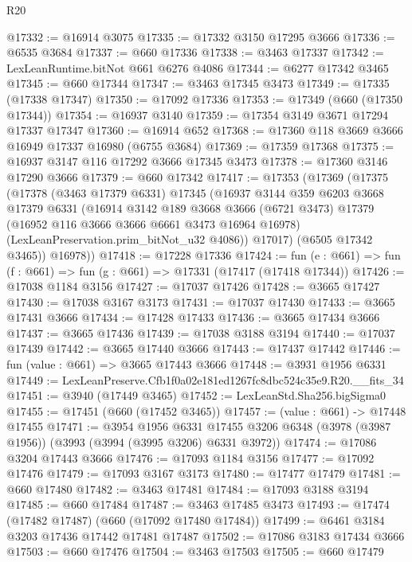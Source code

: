 \begin{lexlean}{R20}
\begin{coremodule}
@17332 := @16914 @3075
@17335 := @17332 @3150 @17295 @3666
@17336 := @6535 @3684
@17337 := @660 @17336
@17338 := @3463 @17337
@17342 := LexLeanRuntime.bitNot @661 @6276 @4086
@17344 := @6277 @17342 @3465
@17345 := @660 @17344
@17347 := @3463 @17345 @3473
@17349 := @17335 (@17338 @17347)
@17350 := @17092 @17336
@17353 := @17349 (@660 (@17350 @17344))
@17354 := @16937 @3140
@17359 := @17354 @3149 @3671 @17294 @17337 @17347
@17360 := @16914 @652
@17368 := @17360 @118 @3669 @3666 @16949 @17337 @16980 (@6755 @3684)
@17369 := @17359 @17368
@17375 := @16937 @3147 @116 @17292 @3666 @17345 @3473
@17378 := @17360 @3146 @17290 @3666
@17379 := @660 @17342
@17417 := @17353
    (@17369
      (@17375
        (@17378
          (@3463 @17379 @6331)
          @17345
          (@16937
            @3144
            @359
            @6203
            @3668
            @17379
            @6331
            (@16914
              @3142
              @189
              @3668
              @3666
              (@6721 @3473)
              @17379
              (@16952 @116 @3666 @3666 @6661 @3473 @16964 @16978)
              (LexLeanPreservation.prim_bitNot_u32 @4086))
            @17017)
          (@6505 @17342 @3465))
        @16978))
@17418 := @17228 @17336
@17424 := fun (e : @661) => fun (f : @661) => fun (g : @661) => @17331 (@17417 (@17418 @17344))
@17426 := @17038 @1184 @3156
@17427 := @17037 @17426
@17428 := @3665 @17427
@17430 := @17038 @3167 @3173
@17431 := @17037 @17430
@17433 := @3665 @17431 @3666
@17434 := @17428 @17433
@17436 := @3665 @17434 @3666
@17437 := @3665 @17436
@17439 := @17038 @3188 @3194
@17440 := @17037 @17439
@17442 := @3665 @17440 @3666
@17443 := @17437 @17442
@17446 := fun (value : @661) => @3665 @17443 @3666
@17448 := @3931 @1956 @6331
@17449 := LexLeanPreserve.Cfb1f0a02e181ed1267fc8dbc524c35e9.R20.__fits_34
@17451 := @3940 (@17449 @3465)
@17452 := LexLeanStd.Sha256.bigSigma0
@17455 := @17451 (@660 (@17452 @3465))
@17457 := (value : @661) -> @17448 @17455
@17471 := @3954
    @1956
    @6331
    @17455
    @3206
    @6348
    (@3978 (@3987 @1956))
    (@3993 (@3994 (@3995 @3206) @6331 @3972))
@17474 := @17086 @3204 @17443 @3666
@17476 := @17093 @1184 @3156
@17477 := @17092 @17476
@17479 := @17093 @3167 @3173
@17480 := @17477 @17479
@17481 := @660 @17480
@17482 := @3463 @17481
@17484 := @17093 @3188 @3194
@17485 := @660 @17484
@17487 := @3463 @17485 @3473
@17493 := @17474 (@17482 @17487) (@660 (@17092 @17480 @17484))
@17499 := @6461 @3184 @3203 @17436 @17442 @17481 @17487
@17502 := @17086 @3183 @17434 @3666
@17503 := @660 @17476
@17504 := @3463 @17503
@17505 := @660 @17479

\end{coremodule}
\end{lexlean}
